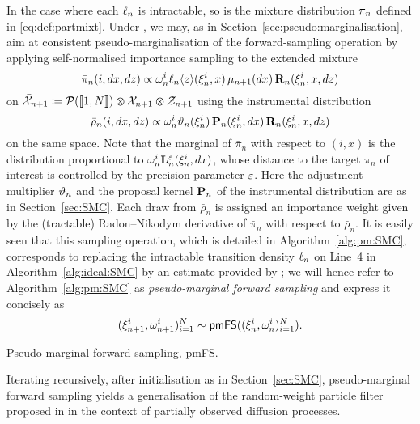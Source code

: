 In the case where each $\ell_{n}$ is intractable, so is the mixture distribution $\pi_n$ defined in \eqref{eq:def:partmixt}. Under , we may, as in Section~\ref{sec:pseudo:marginalisation}, aim at consistent pseudo-marginalisation of the forward-sampling operation by applying self-normalised importance sampling to the extended mixture  
$$
\bar{\pi}_n(i, d x, d z)
\propto \omega_{n}^{i} \ell_{n} \langle z \rangle(\xi_{n}^{i}, x) \, \mu_{n + 1}(d x) \, \mathbf{R}_{n}(\xi_{n}^{i}, x, d z) 
$$
on $\bar{\mathcal{X}}_{n + 1} \coloneqq \mathcal{P}(\llbracket 1, N \rrbracket) \varotimes \mathcal{X}_{n + 1} \varotimes \mathcal{Z}_{n + 1}$ using the instrumental distribution  
$$
\bar{\rho}_n(i, d x, d z) \propto \omega_{n}^{i} \vartheta_{n}(\xi_{n}^{i}) \, \mathbf{P}_{n}(\xi_{n}^{i}, d x) \, \mathbf{R}_{n}(\xi_{n}^{i}, x, d z)
$$
on the same space. Note that the marginal of $\bar{\pi}_n$ with respect to $(i, x)$ is the distribution proportional to $\omega_{n}^{i} \mathbf{L}_{n}^\varepsilon(\xi_{n}^{i}, d x)$, whose distance to the target $\pi_n$ of interest is controlled by the precision parameter $\varepsilon$. Here the adjustment multiplier $\vartheta_{n}$ and the proposal kernel $\mathbf{P}_{n}$ of the instrumental distribution are as in Section~\ref{sec:SMC}. Each draw from $\bar{\rho}_n$ is assigned an importance weight given by the (tractable) Radon--Nikodym derivative of $\bar{\pi}_n$ with respect to $\bar{\rho}_n$. It is easily seen that this sampling operation, which is detailed in Algorithm~\ref{alg:pm:SMC}, corresponds to replacing the intractable transition density $\ell_{n}$ on Line~4 in Algorithm~\ref{alg:ideal:SMC} by an estimate provided by ; we will hence refer to Algorithm~\ref{alg:pm:SMC} as \emph{pseudo-marginal forward sampling} and express it concisely as 
$$
    (\xi_{n + 1}^{i}, \omega_{n + 1}^{i})_{i = 1}^N \sim \mathsf{pmFS}((\xi_{n}^{i}, \omega_{n}^{i})_{i = 1}^N). 
$$

\begin{algorithm}[h] 
\caption{Pseudo-marginal forward sampling, \textsf{pmFS}.} \label{alg:pm:SMC}
\end{algorithm}
Iterating recursively, after initialisation as in Section~\ref{sec:SMC}, pseudo-marginal forward sampling yields a generalisation of the random-weight particle filter proposed in \cite{fearnhead2008particle} in the context of partially observed diffusion processes. 

